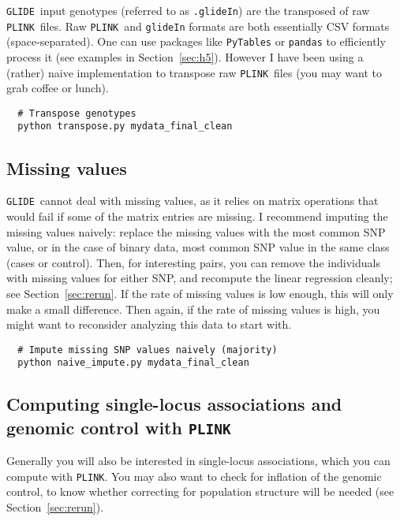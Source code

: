 \documentclass{article}
\newcommand{\glide}{\texttt{GLIDE}}
\newcommand{\plink}{\texttt{PLINK}}
\begin{document}
\glide\ input genotypes (referred to as \texttt{.glideIn}) are the transposed of raw \plink\ files. 
Raw \plink\ and \texttt{glideIn} formats are both essentially CSV formats (space-separated). One can use packages like \texttt{PyTables} or \texttt{pandas} to efficiently process it (see examples in Section~\ref{sec:h5}). However I have been using a (rather) naive implementation to transpose raw \plink\ files (you may want to grab coffee or lunch).\\

\begin{verbatim}
  # Transpose genotypes 
  python transpose.py mydata_final_clean
\end{verbatim}

\subsection{Missing values}

\glide\ cannot deal with missing values, as it relies on matrix operations that would fail if some of the matrix entries are missing. I recommend imputing the missing values naively: replace the missing values with the most common SNP value, or in the case of binary data, most common SNP value in the same class (cases or control). Then, for interesting pairs, you can remove the individuals with missing values for either SNP, and recompute the linear regression cleanly; see Section~\ref{sec:rerun}. If the rate of missing values is low enough, this will only make a small difference. Then again, if the rate of missing values is high, you might want to reconsider analyzing this data to start with.\\

\begin{verbatim}
  # Impute missing SNP values naively (majority)
  python naive_impute.py mydata_final_clean
\end{verbatim} 

\subsection{Computing single-locus associations and genomic control with \plink}
Generally you will also be interested in single-locus associations, which you can compute with \plink. You may also want to check for inflation of the genomic control, to know whether correcting for population structure will be needed (see Section~\ref{sec:rerun}). 
\end{document}
